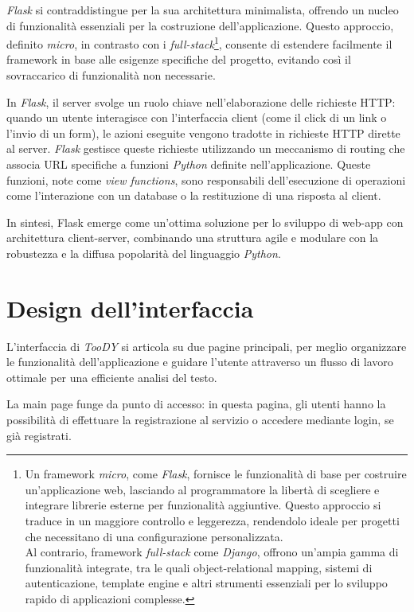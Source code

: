 \documentclass[12pt]{report}
\newcommand{\toody}{\textsl{TooDY}\xspace}
\newcommand{\python}{\textsl{Python}\xspace}
\newcommand{\flask}{\textsl{Flask}\xspace}
\newcommand{\django}{\textsl{Django}\xspace}
\newcommand{\URL}{\textsf{URL}\xspace}
\newcommand{\http}{\textsf{HTTP}\xspace}
\begin{document}
\flask si contraddistingue per la sua architettura minimalista, offrendo un nucleo di funzionalità essenziali per la costruzione dell'applicazione. Questo approccio, definito \textit{micro}, in contrasto con i \textit{full-stack}\footnote{Un framework \textit{micro}, come \flask, fornisce le funzionalità di base per costruire un'applicazione web, lasciando al programmatore la libertà di scegliere e integrare librerie esterne per funzionalità aggiuntive. Questo approccio si traduce in un maggiore controllo e leggerezza, rendendolo ideale per progetti che necessitano di una configurazione personalizzata.\\
Al contrario, framework \textit{full-stack} come \django, offrono un'ampia gamma di funzionalità integrate, tra le quali object-relational mapping, sistemi di autenticazione, template engine e altri strumenti essenziali per lo sviluppo rapido di applicazioni complesse.}, consente di estendere facilmente il framework in base alle esigenze specifiche del progetto, evitando così il sovraccarico di funzionalità non necessarie.

In \flask, il server svolge un ruolo chiave nell'elaborazione delle richieste \http: quando un utente interagisce con l'interfaccia client (come il click di un link o l'invio di un form), le azioni eseguite vengono tradotte in richieste \http dirette al server. \flask gestisce queste richieste utilizzando un meccanismo di routing che associa \URL specifiche a funzioni \python definite nell'applicazione. Queste funzioni, note come \textit{view functions}, sono responsabili dell'esecuzione di operazioni come l'interazione con un database o la restituzione di una risposta al client.

In sintesi, Flask emerge come un'ottima soluzione per lo sviluppo di web-app con architettura client-server, combinando una struttura agile e modulare con la robustezza e la diffusa popolarità del linguaggio \python.


\section{Design dell'interfaccia}
L'interfaccia di \toody si articola su due pagine principali, per meglio organizzare le funzionalità dell'applicazione e guidare l'utente attraverso un flusso di lavoro ottimale per una efficiente analisi del testo.

La \textsf{main page} funge da punto di accesso: in questa pagina, gli utenti hanno la possibilità di effettuare la registrazione al servizio o accedere mediante login, se già registrati.
\end{document}
